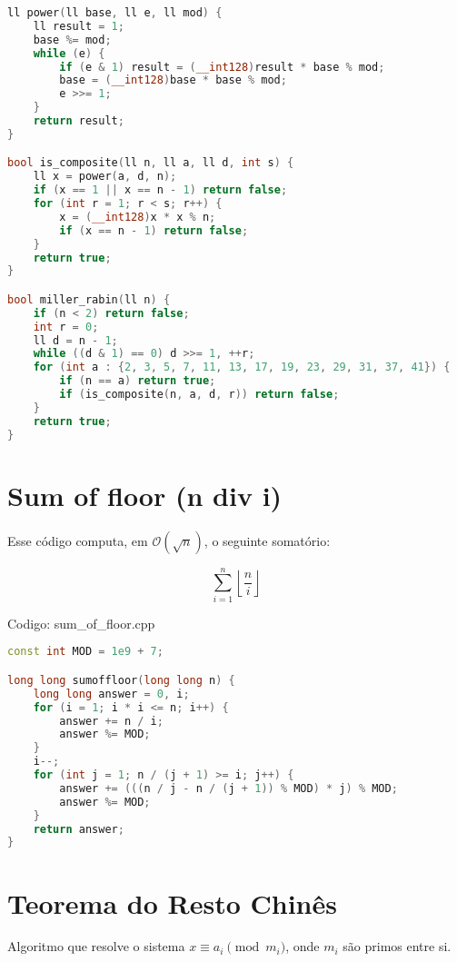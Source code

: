 \documentclass[10pt, a4paper, oneside]{book}
\begin{document}
\begin{lstlisting}[language=C++]
ll power(ll base, ll e, ll mod) {
    ll result = 1;
    base %= mod;
    while (e) {
        if (e & 1) result = (__int128)result * base % mod;
        base = (__int128)base * base % mod;
        e >>= 1;
    }
    return result;
}

bool is_composite(ll n, ll a, ll d, int s) {
    ll x = power(a, d, n);
    if (x == 1 || x == n - 1) return false;
    for (int r = 1; r < s; r++) {
        x = (__int128)x * x % n;
        if (x == n - 1) return false;
    }
    return true;
}

bool miller_rabin(ll n) {
    if (n < 2) return false;
    int r = 0;
    ll d = n - 1;
    while ((d & 1) == 0) d >>= 1, ++r;
    for (int a : {2, 3, 5, 7, 11, 13, 17, 19, 23, 29, 31, 37, 41}) {
        if (n == a) return true;
        if (is_composite(n, a, d, r)) return false;
    }
    return true;
}
\end{lstlisting}
\hfill

\section{Sum of floor (n div i)}


Esse código computa, em $\mathcal{O}(\sqrt{n})$, o seguinte somatório:



$$ \sum_{i=1}^{n} \left\lfloor \frac{n}{i}\right\rfloor $$

\hfill

Codigo: sum\_of\_floor.cpp

\begin{lstlisting}[language=C++]
const int MOD = 1e9 + 7;

long long sumoffloor(long long n) {
    long long answer = 0, i;
    for (i = 1; i * i <= n; i++) {
        answer += n / i;
        answer %= MOD;
    }
    i--;
    for (int j = 1; n / (j + 1) >= i; j++) {
        answer += (((n / j - n / (j + 1)) % MOD) * j) % MOD;
        answer %= MOD;
    }
    return answer;
}
\end{lstlisting}
\hfill

\section{Teorema do Resto Chinês}


Algoritmo que resolve o sistema $x \equiv a_i \pmod{m_i}$, onde $m_i$ são primos entre si.
\end{document}
